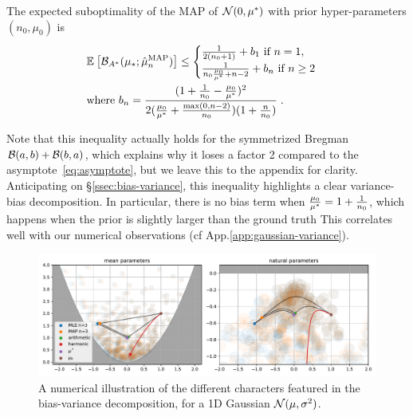 \documentclass[twoside]{article}
\newcommand*{\expect}[2][]{\ensuremath{\mathbb{E}_{#1} \left[ #2 \right] }} %
\newcommand{\logpart}{A}
\newcommand{\bregmanconj}{\cB_{\logpart^*}}
\newcommand{\m}{\mu}
\begin{document}
\begin{theorem}
\label{thm:varianceMAP}
The expected suboptimality of the MAP of $\cN(0,\m^*)$ with prior hyper-parameters $(n_0,\m_0)$ is
 \begin{align}
	& \expect{\bregmanconj( \m_*; \hat \m_n^\mathrm{MAP})}
	\leq \begin{cases}
		\inv{2(n_0+1)}  +  b_1 \ \text{if}\ n=1,\\
		\frac{1}{n_0 \frac{\m_0}{\m^*} +n-2} + b_n \ \text{if}\ n\geq 2
	\end{cases}
	\label{eq:MAP_rate}\\
	& \text{where }b_n = \frac{(1 + \inv{n_0} - \frac{\m_0}{\m^*})^2}{2 (\frac{\m_0}{\m^*}+\frac{\max(0,n-2)}{n_0})(1 + \frac{n}{n_0} )} \; . \nonumber
\end{align}
\end{theorem}
Note that this inequality actually holds for the symmetrized Bregman ${\mathcal B}(a,b) + {\mathcal B}(b,a)$, which explains why it loses a factor 2 compared to the asymptote~\eqref{eq:asymptote}, but we leave this to the appendix for clarity.
Anticipating on \S\ref{ssec:bias-variance}, this inequality highlights a clear variance-bias decomposition.
In particular, there is no bias term when $\frac{\m_0}{\m^*} =1 + \inv{n_0} $, which happens when the prior is slightly larger than the ground truth
This correlates well with our numerical observations (cf App.\ref{app:gaussian-variance}).

\begin{figure}[t]
	\centering
	\includegraphics[width=\textwidth]{figs/thales/numerical_schema_n=3.pdf}
	\caption{A numerical illustration of the different characters featured in the bias-variance decomposition, for a 1D Gaussian ${\mathcal N}(\mu, \sigma^2)$.
	}
	\label{fig:thales}
\end{figure}
\end{document}
